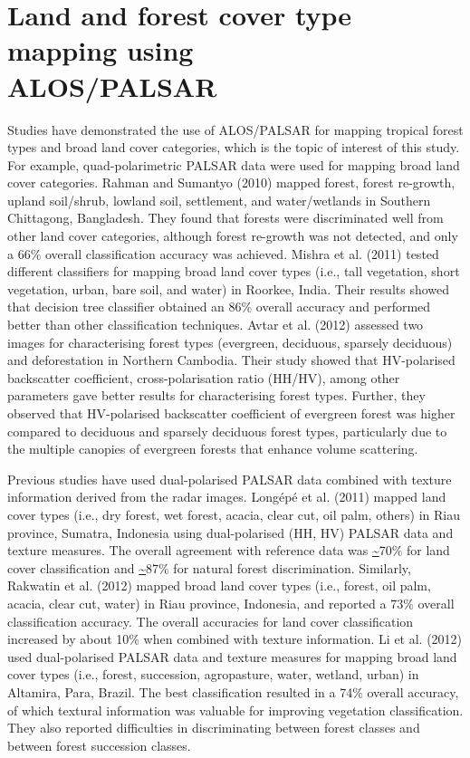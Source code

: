 \section{Land and forest cover type mapping using\\ ALOS/PALSAR}
\label{sec: litrev-forest-mapping-palsar}

Studies have demonstrated the use of ALOS/PALSAR for mapping tropical forest types and broad land cover categories, which is the topic of interest of this study. For example, quad-polarimetric PALSAR data were used for mapping broad land cover categories. Rahman and Sumantyo (2010) mapped forest, forest re-growth, upland soil/shrub, lowland soil, settlement, and water/wetlands in Southern Chittagong, Bangladesh. They found that forests were discriminated well from other land cover categories, although forest re-growth was not detected, and only a 66\% overall classification accuracy was achieved. Mishra et al. (2011) tested different classifiers for mapping broad land cover types (i.e., tall vegetation, short vegetation, urban, bare soil, and water) in Roorkee, India. Their results showed that decision tree classifier obtained an 86\% overall accuracy and performed better than other classification techniques. Avtar et al. (2012) assessed two images for characterising forest types (evergreen, deciduous, sparsely deciduous) and deforestation in Northern Cambodia. Their study showed that HV-polarised backscatter coefficient, cross-polarisation ratio (HH/HV), among other parameters gave better results for characterising forest types. Further, they observed that HV-polarised backscatter coefficient of evergreen forest was higher compared to deciduous and sparsely deciduous forest types, particularly due to the multiple canopies of evergreen forests that enhance volume scattering.

Previous studies have used dual-polarised PALSAR data combined with texture information derived from the radar images. Longépé et al. (2011) mapped land cover types (i.e., dry forest, wet forest, acacia, clear cut, oil palm, others) in Riau province, Sumatra, Indonesia using dual-polarised (HH, HV) PALSAR data and texture measures. The overall agreement with reference data was \url{~}70\% for land cover classification and \url{~}87\% for natural forest discrimination. Similarly, Rakwatin et al. (2012) mapped broad land cover types (i.e., forest, oil palm, acacia, clear cut, water) in Riau province, Indonesia, and reported a 73\% overall classification accuracy. The overall accuracies for land cover classification increased by about 10\% when combined with texture information. Li et al. (2012) used dual-polarised PALSAR data and texture measures for mapping broad land cover types (i.e., forest, succession, agropasture, water, wetland, urban) in Altamira, Para, Brazil. The best classification resulted in a 74\% overall accuracy, of which textural information was valuable for improving vegetation classification. They also reported difficulties in discriminating between forest classes and between forest succession classes.

